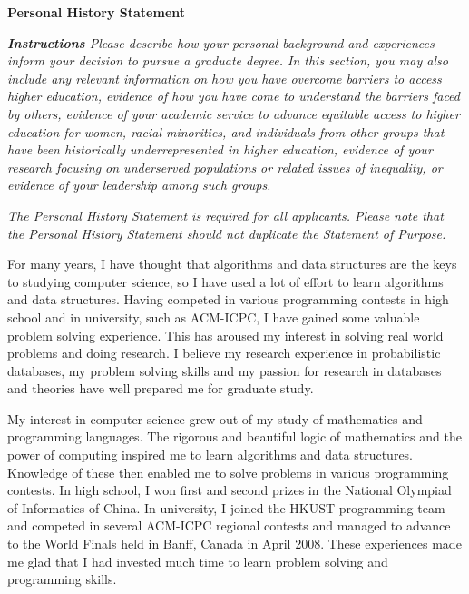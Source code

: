 \documentclass[10pt]{report}
\begin{document}
\begin{center}
\textbf{\large Personal History Statement}
\end{center}

\textsl{\textbf{Instructions} Please describe how your personal background and experiences inform your decision to pursue a graduate degree. In this section, you may also include any relevant information on how you have overcome barriers to access higher education, evidence of how you have come to understand the barriers faced by others, evidence of your academic service to advance equitable access to higher education for women, racial minorities, and individuals from other groups that have been historically underrepresented in higher education, evidence of your research focusing on underserved populations or related issues of inequality, or evidence of your leadership among such groups.}


\textsl{The Personal History Statement is required for all applicants. Please note that the Personal History Statement should not duplicate the Statement of Purpose.} 




\vspace{0.2cm}
For many years, I have thought that algorithms and data structures are the keys to studying computer science, so I have used a lot of effort to learn algorithms and data structures. Having competed in various programming contests in high school and in university, such as ACM-ICPC, I have gained some valuable problem solving experience. This has aroused my interest in solving real world problems and doing research. I believe my research experience in probabilistic databases, my problem solving skills and my passion for research in databases and theories have well prepared me for graduate study. 

\vspace{0.2cm}
My interest in computer science grew out of my study of mathematics and programming languages. The rigorous and beautiful logic of mathematics and the power of computing inspired me to learn algorithms and data structures. Knowledge of these then enabled me to solve problems in various programming contests. In high school, I won first and second prizes in the National Olympiad of Informatics of China. In university, I joined the HKUST programming team and competed in several ACM-ICPC regional contests and managed to advance to the World Finals held in Banff, Canada in April 2008. These experiences made me glad that I had invested much time to learn problem solving and programming skills.
\end{document}
